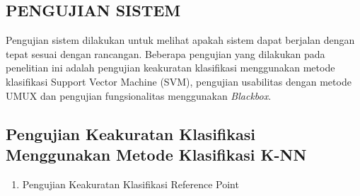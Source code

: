 \begin{enumerate}[a.]
\begin{enumerate}[a.]

\section{\uppercase{PENGUJIAN SISTEM}}
\par Pengujian sistem dilakukan untuk melihat apakah sistem dapat berjalan dengan tepat sesuai dengan rancangan. Beberapa pengujian yang dilakukan pada penelitian ini adalah pengujian keakuratan klasifikasi menggunakan metode klasifikasi Support Vector Machine (SVM), pengujian usabilitas dengan metode UMUX dan pengujian fungsionalitas menggunakan \textit{Blackbox}.

\subsection{Pengujian Keakuratan Klasifikasi Menggunakan Metode Klasifikasi K-NN}
\begin{enumerate}

	\item Pengujian Keakuratan Klasifikasi Reference Point


\end{enumerate}
\end{enumerate}
\end{enumerate}

